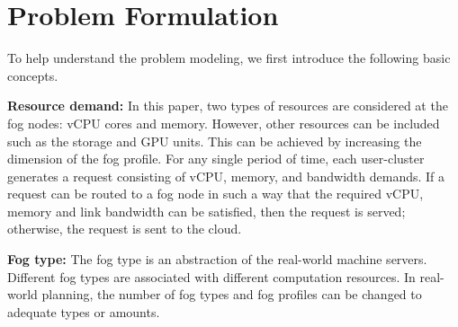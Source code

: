 \documentclass[10pt,journal,compsoc]{IEEEtran}
\begin{document}
\section{Problem Formulation}\label{probfor}
To help understand the problem modeling, we first introduce the following basic concepts.



\textbf{Resource demand: }In this paper, two types of resources are considered at the fog nodes: vCPU cores and memory. 
However, other resources can be included such as the storage and GPU units. This can be achieved by increasing the dimension of the fog profile. For any single period of time, each user-cluster generates a request consisting of vCPU, memory, and bandwidth demands. If a request can be routed to a fog node in such a way that the required vCPU, memory and link bandwidth can be satisfied, then the request is served; otherwise, the request is sent to the cloud. 

\textbf{Fog type: }The fog type is an abstraction of the real-world machine servers. Different fog types are associated with different computation resources. In real-world planning, the number of fog types and fog profiles can be changed to adequate types or amounts.
\end{document}
